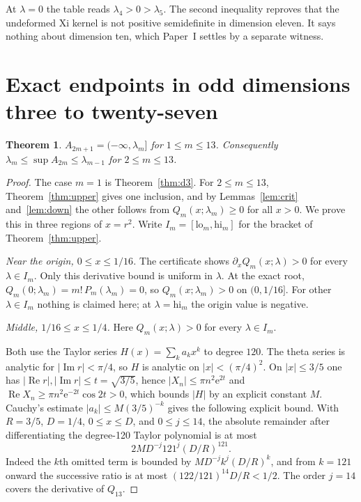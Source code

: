 \documentclass[11pt]{article}
\newtheorem{theorem}{Theorem}
\theoremstyle{remark}
\newcommand{\ee}{\mathrm{e}}
\begin{document}
At $\lambda=0$ the table reads $\lambda_4>0>\lambda_5$. The second inequality reproves that the
undeformed Xi kernel is not positive semidefinite in dimension eleven. It says nothing about
dimension ten, which Paper~I settles by a separate witness.

\section{Exact endpoints in odd dimensions three to twenty-seven}
\begin{theorem}\label{thm:sharp}
$A_{2m+1}=(-\infty,\lambda_m]$ for $1\le m\le13$.
Consequently $\lambda_m\le\sup A_{2m}\le\lambda_{m-1}$ for $2\le m\le13$.
\end{theorem}
\begin{proof}
The case $m=1$ is Theorem~\ref{thm:d3}. For $2\le m\le13$, Theorem~\ref{thm:upper} gives one
inclusion, and by Lemmas~\ref{lem:crit} and~\ref{lem:down} the other follows from
$Q_m(x;\lambda_m)\ge0$ for all $x>0$. We prove this in three regions of $x=r^2$. Write
$I_m=[\mathrm{lo}_m,\mathrm{hi}_m]$ for the bracket of Theorem~\ref{thm:upper}.

\emph{Near the origin, $0\le x\le1/16$.} The certificate shows $\partial_xQ_m(x;\lambda)>0$ for
every $\lambda\in I_m$. Only this derivative bound is uniform in $\lambda$. At the exact root,
$Q_m(0;\lambda_m)=m!\,P_m(\lambda_m)=0$, so $Q_m(x;\lambda_m)>0$ on $(0,1/16]$. For other
$\lambda\in I_m$ nothing is claimed here; at $\lambda=\mathrm{hi}_m$ the origin value is negative.

\emph{Middle, $1/16\le x\le1/4$.} Here $Q_m(x;\lambda)>0$ for every $\lambda\in I_m$.

Both use the Taylor series $H(x)=\sum_k a_kx^k$ to degree $120$. The theta series is analytic
for $\lvert\operatorname{Im}r\rvert<\pi/4$, so $H$ is analytic on $\lvert x\rvert<(\pi/4)^2$. On
$\lvert x\rvert\le3/5$ one has $\lvert\operatorname{Re}r\rvert,\lvert\operatorname{Im}r\rvert\le t=\sqrt{3/5}$,
hence $\lvert X_n\rvert\le\pi n^2\ee^{2t}$ and $\operatorname{Re}X_n\ge\pi n^2\ee^{-2t}\cos2t>0$,
which bounds $\lvert H\rvert$ by an explicit constant $M$. Cauchy's estimate
$\lvert a_k\rvert\le M(3/5)^{-k}$ gives the following explicit bound.
With $R=3/5$, $D=1/4$, $0\le x\le D$, and $0\le j\le14$, the absolute
remainder after differentiating the degree-120 Taylor polynomial is at most
\[
  2M D^{-j}121^j(D/R)^{121}.
\]
Indeed the $k$th omitted term is bounded by $MD^{-j}k^j(D/R)^k$,
and from $k=121$ onward the successive ratio is at most
$(122/121)^{14}D/R<1/2$. The order $j=14$ covers the derivative of $Q_{13}$.


\end{proof}
\end{document}
